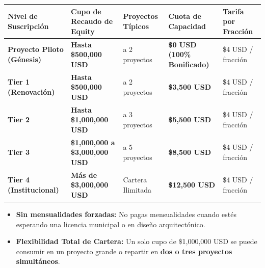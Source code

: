 \documentclass[
]{article}
\newcounter{none} %
\providecommand{\tightlist}{%
  \setlength{\itemsep}{0pt}\setlength{\parskip}{0pt}}
\begin{document}
{\def\LTcaptype{none} %
\begin{longtable}[]{@{}
  >{\raggedright\arraybackslash}p{}
  >{\centering\arraybackslash}p{}
  >{\centering\arraybackslash}p{}
  >{\centering\arraybackslash}p{}
  >{\centering\arraybackslash}p{}@{}}
\toprule\noalign{}
\begin{minipage}[b]{\linewidth}\raggedright
Nivel de Suscripción
\end{minipage} & \begin{minipage}[b]{\linewidth}\centering
Cupo de Recaudo de Equity
\end{minipage} & \begin{minipage}[b]{\linewidth}\centering
Proyectos Típicos
\end{minipage} & \begin{minipage}[b]{\linewidth}\centering
Cuota de Capacidad
\end{minipage} & \begin{minipage}[b]{\linewidth}\centering
Tarifa por Fracción
\end{minipage} \\
\midrule\noalign{}
\endhead
\bottomrule\noalign{}
\endlastfoot
\textbf{Proyecto Piloto (Génesis)} & \textbf{Hasta \$500,000 USD} & 1 a
2 proyectos & \textbf{\$0 USD (100\% Bonificado)} & \$4 USD /
fracción \\
\textbf{Tier 1 (Renovación)} & \textbf{Hasta \$500,000 USD} & 1 a 2
proyectos & \textbf{\$3,500 USD} & \$4 USD / fracción \\
\textbf{Tier 2} & \textbf{Hasta \$1,000,000 USD} & 1 a 3 proyectos &
\textbf{\$5,500 USD} & \$4 USD / fracción \\
\textbf{Tier 3} & \textbf{\$1,000,000 a \$3,000,000 USD} & 2 a 5
proyectos & \textbf{\$8,500 USD} & \$4 USD / fracción \\
\textbf{Tier 4 (Institucional)} & \textbf{Más de \$3,000,000 USD} &
Cartera Ilimitada & \textbf{\$12,500 USD} & \$4 USD / fracción \\
\end{longtable}
}

\begin{itemize}
\tightlist
\item
  \textbf{Sin mensualidades forzadas:} No pagas mensualidades cuando
  estés esperando una licencia municipal o en diseño arquitectónico.
\item
  \textbf{Flexibilidad Total de Cartera:} Un solo cupo de \$1,000,000
  USD se puede consumir en un proyecto grande o repartir en \textbf{dos
  o tres proyectos simultáneos}.
\end{itemize}
\end{document}
